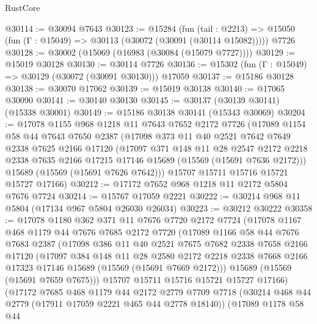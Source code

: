 \begin{lexlean}{RustCore}
\begin{coremodule}
@30114 := @30094 @7643
@30123 := @15284
    (fun (tail : @2213) => @15050 (fun (Γ : @15049) => @30113 (@30072 (@30091 (@30114 @15082)))))
    @7726
@30128 := @30002 (@15069 (@16983 (@30084 (@15079 @7727))))
@30129 := @15019 @30128
@30130 := @30114 @7726
@30136 := @15302 (fun (Γ : @15049) => @30129 (@30072 (@30091 @30130))) @17059
@30137 := @15186 @30128
@30138 := @30070 @17062
@30139 := @15019 @30138
@30140 := @17065 @30090
@30141 := @30140 @30130
@30145 := @30137 (@30139 @30141) (@15338 @30001)
@30149 := @15186 @30138 @30141 (@15343 @30069)
@30204 := @17078
    @1155
    @968
    @1218
    @11
    @7643
    @7652
    @2172
    @7726
    (@17089
      @1154
      @58
      @44
      @7643
      @7650
      @2387
      (@17098
        @373
        @11
        @40
        @2521
        @7642
        @7649
        @2338
        @7625
        @2166
        @17120
        (@17097
          @371
          @148
          @11
          @28
          @2547
          @2172
          @2218
          @2338
          @7635
          @2166
          @17215
          @17146
          @15689
          (@15569 (@15691 @7636 @2172)))
        @15689
        (@15569 (@15691 @7626 @7642)))
      @15707
      @15711
      @15716
      @15721
      @15727
      @17166)
@30212 := @17172 @7652 @968 @1218 @11 @2172 @5804 @7676 @7724
@30214 := @15767 @17059 @2221
@30222 := @30214 @968 @11 @5804 (@17134 @967 @5804 @26030 @26034)
@30223 := @30212 @30222
@30358 := @17078
    @1180
    @362
    @371
    @11
    @7676
    @7720
    @2172
    @7724
    (@17078
      @1167
      @468
      @1179
      @44
      @7676
      @7685
      @2172
      @7720
      (@17089
        @1166
        @58
        @44
        @7676
        @7683
        @2387
        (@17098
          @386
          @11
          @40
          @2521
          @7675
          @7682
          @2338
          @7658
          @2166
          @17120
          (@17097
            @384
            @148
            @11
            @28
            @2580
            @2172
            @2218
            @2338
            @7668
            @2166
            @17323
            @17146
            @15689
            (@15569 (@15691 @7669 @2172)))
          @15689
          (@15569 (@15691 @7659 @7675)))
        @15707
        @15711
        @15716
        @15721
        @15727
        @17166)
      (@17172
        @7685
        @468
        @1179
        @44
        @2172
        @2779
        @7709
        @7718
        (@30214 @468 @44 @2779 (@17911 @17059 @2221 @465 @44 @2778 @18140))
        (@17089
          @1178
          @58
          @44

\end{coremodule}
\end{lexlean}
